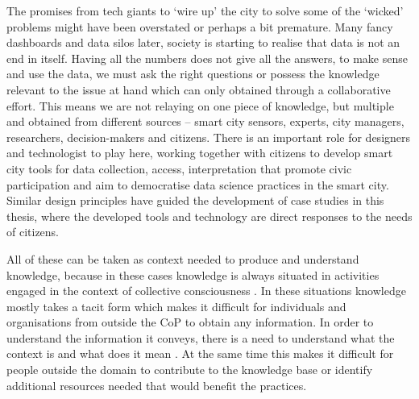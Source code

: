 
The promises from tech giants to `wire up' the city to solve some of the `wicked' problems might have been overstated or perhaps a bit premature. Many fancy dashboards and data silos later, society is starting to realise that data is not an end in itself. Having all the numbers does not give all the answers, to make sense and use the data, we must ask the right questions or possess the knowledge relevant to the issue at hand which can only obtained through a collaborative effort. This means we are not relaying on one piece of knowledge, but multiple and obtained from different sources -- smart city sensors, experts, city managers, researchers, decision-makers and citizens. There is an important role for designers and technologist to play here, working together with citizens to develop smart city tools for data collection, access, interpretation that promote civic participation and aim to democratise data science practices in the smart city. Similar design principles have guided the development of case studies in this thesis, where the developed tools and technology are direct responses to the needs of citizens.

All of these can be taken as context needed to produce and understand knowledge, because in these cases knowledge is always situated in activities engaged in the context of collective consciousness \citep{winograd_understanding_1986,hakken_social_2003}. In these situations knowledge mostly takes a tacit form \citep{polanyi_tacit_2009} which makes it difficult for individuals and organisations from outside the CoP to obtain any information. In order to understand the information it conveys, there is a need to understand what the context is and what does it mean \citep{hakken_social_2003}. At the same time this makes it difficult for people outside the domain to contribute to the knowledge base or identify additional resources needed that would benefit the practices.

